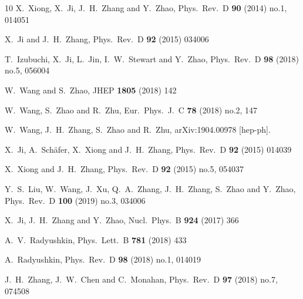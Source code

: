 \begin{thebibliography}{10}
  X.~Xiong, X.~Ji, J.~H.~Zhang and Y.~Zhao,
  Phys.\ Rev.\ D {\bf 90} (2014) no.1, 014051

  X.~Ji and J.~H.~Zhang,
  Phys.\ Rev.\ D {\bf 92} (2015) 034006

  T.~Izubuchi, X.~Ji, L.~Jin, I.~W.~Stewart and Y.~Zhao,
  Phys.\ Rev.\ D {\bf 98} (2018) no.5, 056004

  W.~Wang and S.~Zhao,
  JHEP {\bf 1805} (2018) 142

  W.~Wang, S.~Zhao and R.~Zhu,
  Eur.\ Phys.\ J.\ C {\bf 78} (2018) no.2, 147

  W.~Wang, J.~H.~Zhang, S.~Zhao and R.~Zhu,
  arXiv:1904.00978 [hep-ph].

  X.~Ji, A.~Sch{\"a}fer, X.~Xiong and J.~H.~Zhang,
  Phys.\ Rev.\ D {\bf 92} (2015) 014039

  X.~Xiong and J.~H.~Zhang,
  Phys.\ Rev.\ D {\bf 92} (2015) no.5, 054037

  Y.~S.~Liu, W.~Wang, J.~Xu, Q.~A.~Zhang, J.~H.~Zhang, S.~Zhao and Y.~Zhao,
  Phys.\ Rev.\ D {\bf 100} (2019) no.3, 034006

  X.~Ji, J.~H.~Zhang and Y.~Zhao,
  Nucl.\ Phys.\ B {\bf 924} (2017) 366

  A.~V.~Radyushkin,
  Phys.\ Lett.\ B {\bf 781} (2018) 433

  A.~Radyushkin,
  Phys.\ Rev.\ D {\bf 98} (2018) no.1, 014019

  J.~H.~Zhang, J.~W.~Chen and C.~Monahan,
  Phys.\ Rev.\ D {\bf 97} (2018) no.7, 074508


\end{thebibliography}
